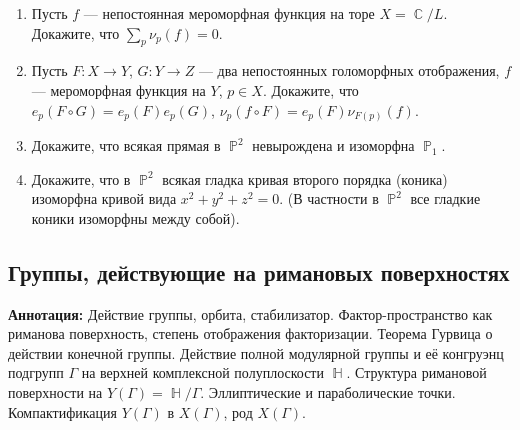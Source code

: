 \documentclass[a4paper, 12pt]{article}
\let\iff\relax
\DeclareMathOperator{\iff}{\Leftrightarrow}
\DeclareMathOperator{\CC}{\mathbb{C}}
\DeclareMathOperator{\HH}{\mathbb{H}}
\DeclareMathOperator{\PP}{\mathbb{P}}
\begin{document}
\begin{enumerate}[noitemsep,topsep=0pt]
    \begin{itemize}[noitemsep,topsep=0pt]
        \item Пусть $L\subseteq L'$, докажите, что естественная проекция $\CC/L\rightarrow\CC/L'$ голоморфно, и что голоморфное отображение $\CC/L'\rightarrow\CC/L$ существует $\iff$ $L=L'$;
        \item Пусть $L$ --- решётка в $\CC$, $\alpha \in \CC^*$. Покажите, что $\alpha L$ --- также решётка, и что отображение $\phi: \CC/L \rightarrow \CC/(\alpha L): z+L \mapsto \alpha z + \alpha L$ --- корректно определенное биголоморфное отображение.
        \item Покажите, что всякий тор $\CC/L$ изоморфен тору вида $\CC/L(1,\tau)$, $\tau \in \HH$.
    \end{itemize}%
    \item Пусть $f$ --- непостоянная мероморфная функция на торе $X=\CC/L$. Докажите, что $\sum_p \nu_p(f) = 0$. %
    \item Пусть $F:X\rightarrow Y$, $G:Y\rightarrow Z$ --- два непостоянных голоморфных отображения, $f$ --- мероморфная функция на $Y$, $p\in X$. Докажите, что $e_p(F\circ G) = e_p(F) e_p(G)$, $\nu_p(f\circ F) = e_p(F) \nu_{F(p)}(f)$. %
    \item Докажите, что всякая прямая в $\PP^2$ невырождена и изоморфна $\PP_1$. %
    \item Докажите, что в $\PP^2$ всякая гладка кривая второго порядка (коника) изоморфна кривой вида $x^2+y^2+z^2=0$. (В частности в $\PP^2$ все гладкие коники изоморфны между собой). %
\end{enumerate}

\subsection{Группы, действующие на римановых поверхностях}

{\bf Аннотация:} Действие группы, орбита, стабилизатор. Фактор-пространство как риманова поверхность, степень отображения факторизации. Теорема Гурвица о действии конечной группы. Действие полной модулярной группы и её конгруэнц подгрупп $\Gamma$ на верхней комплексной полуплоскости $\HH$. Структура римановой поверхности на $Y(\Gamma) = \HH/\Gamma$. Эллиптические и параболические точки. Компактификация $Y(\Gamma)$ в $X(\Gamma)$, род $X(\Gamma)$.
\end{document}
